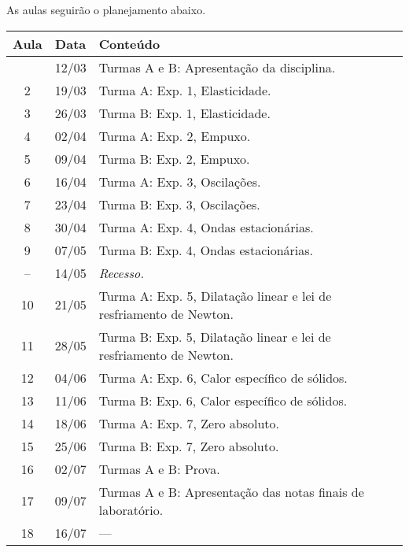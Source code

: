As aulas seguirão o planejamento abaixo.
\begin{center}
\begin{longtable}{ccp{70mm}}
\toprule
Aula & Data & Conteúdo \\
\midrule
\endhead
\bottomrule
\endfoot
 1 & 12/03 & Turmas A e B: Apresentação da disciplina. \\
 2 & 19/03 & Turma A: Exp. 1, Elasticidade. \\
 3 & 26/03 & Turma B: Exp. 1, Elasticidade. \\
 4 & 02/04 & Turma A: Exp. 2, Empuxo. \\ 
 5 & 09/04 & Turma B: Exp. 2, Empuxo. \\
 6 & 16/04 & Turma A: Exp. 3, Oscilações. \\
 7 & 23/04 & Turma B: Exp. 3, Oscilações. \\
 8 & 30/04 & Turma A: Exp. 4, Ondas estacionárias. \\
 9 & 07/05 & Turma B: Exp. 4, Ondas estacionárias. \\
-- & 14/05 & \emph{Recesso.}\\
10 & 21/05 & Turma A: Exp. 5, Dilatação linear e lei de resfriamento de Newton. \\
11 & 28/05 & Turma B: Exp. 5, Dilatação linear e lei de resfriamento de Newton. \\
12 & 04/06 & Turma A: Exp. 6, Calor específico de sólidos. \\
13 & 11/06 & Turma B: Exp. 6, Calor específico de sólidos. \\
14 & 18/06 & Turma A: Exp. 7, Zero absoluto. \\
15 & 25/06 & Turma B: Exp. 7, Zero absoluto. \\
16 & 02/07 & Turmas A e B: Prova. \\
17 & 09/07 & Turmas A e B: Apresentação das notas finais de laboratório. \\
18 & 16/07 & --- \\
\end{longtable}
\end{center}


\cleardoublepage
